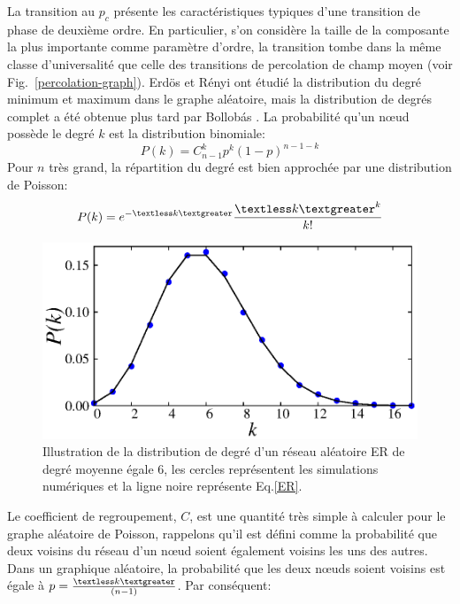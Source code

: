 La transition au $p_c$ présente les caractéristiques typiques d'une transition de phase de deuxième ordre. En particulier, s'on considère la taille de la composante la plus importante comme paramètre d'ordre, la transition tombe dans la même classe d'universalité que celle des transitions de percolation de champ moyen (voir Fig.~\ref{percolation-graph}). Erdös et Rényi ont étudié la distribution du degré minimum et maximum dans le graphe aléatoire, mais la distribution de degrés complet a été obtenue plus tard par Bollobás \cite{Bollobas1998}. La probabilité qu'un nœud possède le degré  $k$ est la distribution binomiale:
\begin{equation}
P(k)=C^k_{n-1}p^k(1-p)^{n-1-k}
\end{equation}
 Pour $n$ très grand, la répartition du degré est bien approchée par une distribution de Poisson:
 \begin{equation}
 P(k)=e^{-\textless k\textgreater}\dfrac{\textless k\textgreater^k}{k!}
 \label{ER}
 \end{equation}
\begin{figure}[h!]
	\centering
	\includegraphics[scale=1]{./figures/fig-ER-dist}
	\caption{Illustration de la distribution de degré d'un réseau aléatoire ER de degré moyenne égale $6$, les cercles représentent les simulations numériques et la ligne noire représente Eq.\ref{ER}.}
	
	\label{ER-distribution}
\end{figure} 

 Le coefficient de regroupement, $C$, est une quantité très simple à calculer pour le graphe aléatoire de Poisson, rappelons qu'il est défini comme la probabilité que deux voisins du réseau d'un nœud soient également voisins les uns des autres. Dans un graphique aléatoire, la probabilité que les deux nœuds soient voisins est égale à $p=\frac{\textless k\textgreater}{(n - 1)}$. Par conséquent:
 
